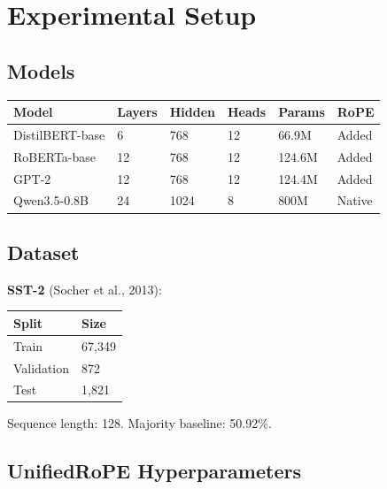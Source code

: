 
\section{Experimental Setup}

\subsection{Models}

\begin{table}[H]
\centering
\small
\begin{tabular}{llllll}
\toprule
\textbf{Model} & \textbf{Layers} & \textbf{Hidden} & \textbf{Heads} & \textbf{Params} & \textbf{RoPE} \\
\midrule
DistilBERT-base & 6 & 768 & 12 & 66.9M & Added \\
RoBERTa-base & 12 & 768 & 12 & 124.6M & Added \\
GPT-2 & 12 & 768 & 12 & 124.4M & Added \\
Qwen3.5-0.8B & 24 & 1024 & 8 & 800M & Native \\
\bottomrule
\end{tabular}
\end{table}

\subsection{Dataset}

\textbf{SST-2} (Socher et al., 2013):

\begin{table}[H]
\centering
\small
\begin{tabular}{ll}
\toprule
\textbf{Split} & \textbf{Size} \\
\midrule
Train & 67,349 \\
Validation & 872 \\
Test & 1,821 \\
\bottomrule
\end{tabular}
\end{table}

Sequence length: 128. Majority baseline: 50.92\%.

\subsection{UnifiedRoPE Hyperparameters}

